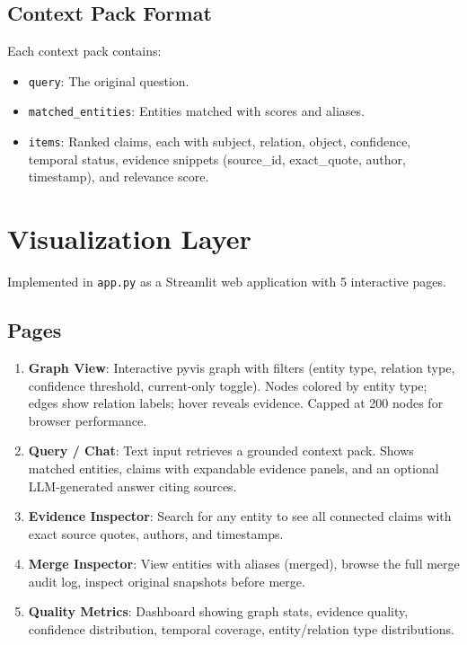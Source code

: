 \documentclass[11pt,a4paper]{article}
\begin{document}
\subsection{Context Pack Format}
Each context pack contains:
\begin{itemize}[nosep]
    \item \texttt{query}: The original question.
    \item \texttt{matched\_entities}: Entities matched with scores and aliases.
    \item \texttt{items}: Ranked claims, each with subject, relation, object, confidence, temporal status, evidence snippets (source\_id, exact\_quote, author, timestamp), and relevance score.
\end{itemize}

\section{Visualization Layer}

Implemented in \texttt{app.py} as a Streamlit web application with 5 interactive pages.

\subsection{Pages}

\begin{enumerate}
    \item \textbf{Graph View}: Interactive pyvis graph with filters (entity type, relation type, confidence threshold, current-only toggle). Nodes colored by entity type; edges show relation labels; hover reveals evidence. Capped at 200 nodes for browser performance.
    
    \item \textbf{Query / Chat}: Text input retrieves a grounded context pack. Shows matched entities, claims with expandable evidence panels, and an optional LLM-generated answer citing sources.
    
    \item \textbf{Evidence Inspector}: Search for any entity to see all connected claims with exact source quotes, authors, and timestamps.
    
    \item \textbf{Merge Inspector}: View entities with aliases (merged), browse the full merge audit log, inspect original snapshots before merge.
    
    \item \textbf{Quality Metrics}: Dashboard showing graph stats, evidence quality, confidence distribution, temporal coverage, entity/relation type distributions.
\end{enumerate}
\end{document}
